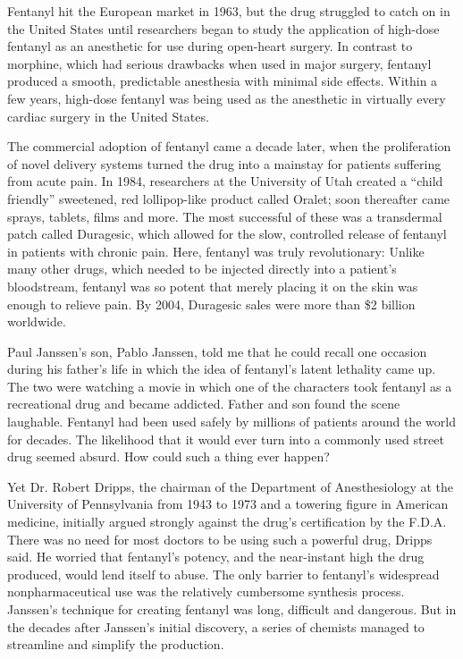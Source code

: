 Fentanyl hit the European market in 1963, but the drug struggled to
catch on in the United States until researchers began to study the
application of high-dose fentanyl as an anesthetic for use during
open-heart surgery. In contrast to morphine, which had serious drawbacks
when used in major surgery, fentanyl produced a smooth, predictable
anesthesia with minimal side effects. Within a few years, high-dose
fentanyl was being used as the anesthetic in virtually every cardiac
surgery in the United States.

The commercial adoption of fentanyl came a decade later, when the
proliferation of novel delivery systems turned the drug into a mainstay
for patients suffering from acute pain. In 1984, researchers at the
University of Utah created a ``child friendly'' sweetened, red
lollipop-like product called Oralet; soon thereafter came sprays,
tablets, films and more. The most successful of these was a transdermal
patch called Duragesic, which allowed for the slow, controlled release
of fentanyl in patients with chronic pain. Here, fentanyl was truly
revolutionary: Unlike many other drugs, which needed to be injected
directly into a patient's bloodstream, fentanyl was so potent that
merely placing it on the skin was enough to relieve pain. By 2004,
Duragesic sales were more than \$2 billion worldwide.

Paul Janssen's son, Pablo Janssen, told me that he could recall one
occasion during his father's life in which the idea of fentanyl's latent
lethality came up. The two were watching a movie in which one of the
characters took fentanyl as a recreational drug and became addicted.
Father and son found the scene laughable. Fentanyl had been used safely
by millions of patients around the world for decades. The likelihood
that it would ever turn into a commonly used street drug seemed absurd.
How could such a thing ever happen?

Yet Dr. Robert Dripps, the chairman of the Department of Anesthesiology
at the University of Pennsylvania from 1943 to 1973 and a towering
figure in American medicine, initially argued strongly against the
drug's certification by the F.D.A. There was no need for most doctors to
be using such a powerful drug, Dripps said. He worried that fentanyl's
potency, and the near-instant high the drug produced, would lend itself
to abuse. The only barrier to fentanyl's widespread nonpharmaceutical
use was the relatively cumbersome synthesis process. Janssen's technique
for creating fentanyl was long, difficult and dangerous. But in the
decades after Janssen's initial discovery, a series of chemists managed
to streamline and simplify the production.

